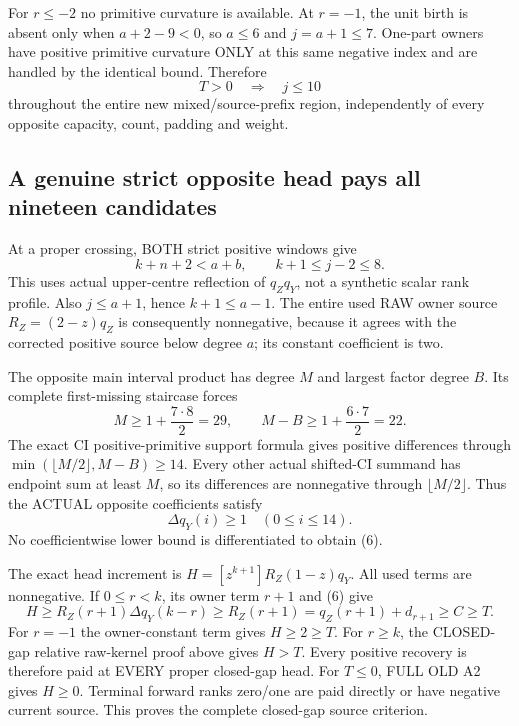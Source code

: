 For $r\le-2$ no primitive curvature is available. At $r=-1$, the
unit birth is absent only when $a+2-9<0$, so $a\le6$ and $j=a+1\le7$.
One-part owners have positive primitive curvature ONLY at this same
negative index and are handled by the identical bound. Therefore
\[
             T>0\quad\Longrightarrow\quad j\le10       \tag{5}
\]
throughout the entire new mixed/source-prefix region, independently
of every opposite capacity, count, padding and weight.

\subsection{A genuine strict opposite head pays all nineteen candidates}
At a proper crossing, BOTH strict positive windows give
\[
                  k+n+2<a+b,\qquad k+1\le j-2\le8.
\]
This uses actual upper-centre reflection of $q_Zq_Y$, not a synthetic
scalar rank profile. Also $j\le a+1$, hence $k+1\le a-1$.
The entire used RAW owner source $R_Z=(2-z)q_Z$ is consequently
nonnegative, because it agrees with the corrected positive source
below degree $a$; its constant coefficient is two.

The opposite main interval product has degree $M$ and largest factor
degree $B$. Its complete first-missing staircase forces
\[
 M\ge1+\frac{7\cdot8}{2}=29,\qquad
 M-B\ge1+\frac{6\cdot7}{2}=22.
\]
The exact CI positive-primitive support formula gives positive
differences through $\min(\lfloor M/2\rfloor,M-B)\ge14$.
Every other actual shifted-CI summand has endpoint sum at least $M$,
so its differences are nonnegative through $\lfloor M/2\rfloor$.
Thus the ACTUAL opposite coefficients satisfy
\[
                       \Delta q_Y(i)\ge1\quad(0\le i\le14).      \tag{6}
\]
No coefficientwise lower bound is differentiated to obtain (6).

The exact head increment is $H=[z^{k+1}]R_Z(1-z)q_Y$.
All used terms are nonnegative. If $0\le r<k$, its owner term $r+1$
and (6) give
\[
 H\ge R_Z(r+1)\Delta q_Y(k-r)
   \ge R_Z(r+1)=q_Z(r+1)+d_{r+1}\ge C\ge T.
\]
For $r=-1$ the owner-constant term gives $H\ge2\ge T$.
For $r\ge k$, the CLOSED-gap relative raw-kernel proof above gives
$H>T$. Every positive recovery is therefore paid at EVERY proper
closed-gap head. For $T\le0$, FULL OLD A2 gives $H\ge0$.
Terminal forward ranks zero/one are paid directly or have negative
current source. This proves the complete closed-gap source criterion.

